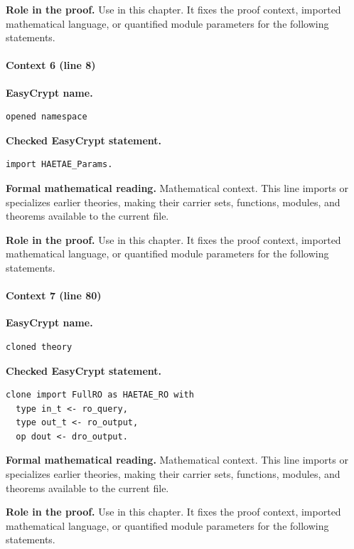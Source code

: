 \noindent\textbf{Role in the proof.}
Use in this chapter. It fixes the proof context, imported mathematical language, or quantified module parameters for the following statements.

\paragraph{Context 6 (line 8)}
\noindent\textbf{EasyCrypt name.}
\begin{lstlisting}[language=EasyCrypt,basicstyle=\ttfamily\scriptsize]
opened namespace
\end{lstlisting}
\noindent\textbf{Checked EasyCrypt statement.}
\begin{lstlisting}[language=EasyCrypt,basicstyle=\ttfamily\scriptsize]
import HAETAE_Params.
\end{lstlisting}
\noindent\textbf{Formal mathematical reading.}
Mathematical context. This line imports or specializes earlier theories, making their carrier sets, functions, modules, and theorems available to the current file.

\noindent\textbf{Role in the proof.}
Use in this chapter. It fixes the proof context, imported mathematical language, or quantified module parameters for the following statements.

\paragraph{Context 7 (line 80)}
\noindent\textbf{EasyCrypt name.}
\begin{lstlisting}[language=EasyCrypt,basicstyle=\ttfamily\scriptsize]
cloned theory
\end{lstlisting}
\noindent\textbf{Checked EasyCrypt statement.}
\begin{lstlisting}[language=EasyCrypt,basicstyle=\ttfamily\scriptsize]
clone import FullRO as HAETAE_RO with
  type in_t <- ro_query,
  type out_t <- ro_output,
  op dout <- dro_output.
\end{lstlisting}
\noindent\textbf{Formal mathematical reading.}
Mathematical context. This line imports or specializes earlier theories, making their carrier sets, functions, modules, and theorems available to the current file.

\noindent\textbf{Role in the proof.}
Use in this chapter. It fixes the proof context, imported mathematical language, or quantified module parameters for the following statements.

